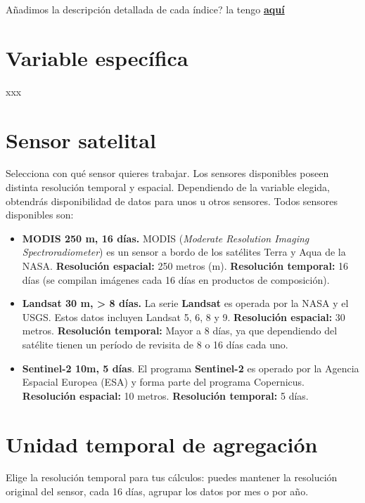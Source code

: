 \documentclass[
]{book}
\providecommand{\tightlist}{%
  \setlength{\itemsep}{0pt}\setlength{\parskip}{0pt}}
\begin{document}
Añadimos la descripción detallada de cada índice? la tengo \href{https://docs.google.com/document/d/1iYMDXfh4uQ9vuNyansFqoBuk0M9Hi5Vo_4U-cOyEGcY/edit?tab=t.0}{\textbf{aquí}}

\chapter{Variable específica}\label{variable-especifica}

xxx

\chapter{Sensor satelital}\label{sensor}

Selecciona con qué sensor quieres trabajar. Los sensores disponibles poseen distinta resolución temporal y espacial. Dependiendo de la variable elegida, obtendrás disponibilidad de datos para unos u otros sensores. Todos sensores disponibles son:

\begin{itemize}
\tightlist
\item
  \textbf{MODIS 250 m, 16 días.} MODIS (\emph{Moderate Resolution Imaging Spectroradiometer}) es un sensor a bordo de los satélites Terra y Aqua de la NASA. \textbf{Resolución espacial:} 250 metros (m). \textbf{Resolución temporal:} 16 días (se compilan imágenes cada 16 días en productos de composición).\\
\item
  \textbf{Landsat 30 m, \textgreater{} 8 días.} La serie \textbf{Landsat} es operada por la NASA y el USGS. Estos datos incluyen Landsat 5, 6, 8 y 9. \textbf{Resolución espacial:} 30 metros. \textbf{Resolución temporal:} Mayor a 8 días, ya que dependiendo del satélite tienen un período de revisita de 8 o 16 días cada uno.\\
\item
  \textbf{Sentinel-2 10m, 5 días}. El programa \textbf{Sentinel-2} es operado por la Agencia Espacial Europea (ESA) y forma parte del programa Copernicus. \textbf{Resolución espacial:} 10 metros. \textbf{Resolución temporal:} 5 días.
\end{itemize}

\chapter{Unidad temporal de agregación}\label{agregacion-temporal}

Elige la resolución temporal para tus cálculos: puedes mantener la resolución original del sensor, cada 16 días, agrupar los datos por mes o por año.
\end{document}

